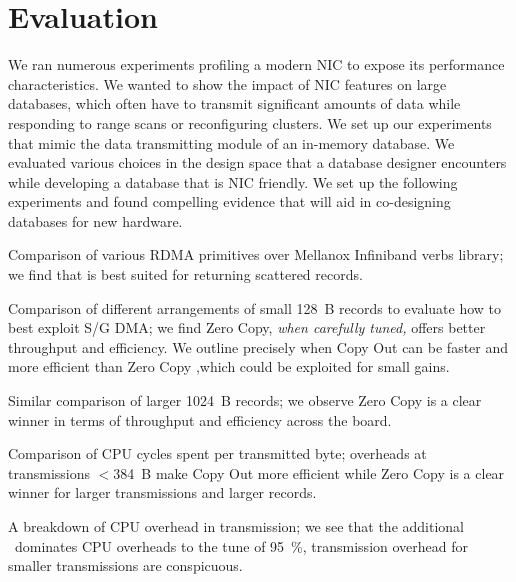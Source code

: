 \section{Evaluation}
We ran numerous experiments profiling a modern NIC to expose its performance characteristics. 
We wanted to show the impact of NIC features on large databases, which often have to 
transmit significant amounts of data while responding to range scans or reconfiguring clusters.
We set up our experiments that mimic the data transmitting module of an in-memory database. 
We evaluated various choices in the design space that a database designer encounters while developing 
a database that is NIC friendly. We set up the following experiments and found compelling 
evidence that will aid in co-designing databases for new hardware.
\begin{myitemize}
\item Comparison of various RDMA primitives over Mellanox Infiniband verbs library; we find that  is best suited for returning scattered records.
\item Comparison of different arrangements of small 128~B records to evaluate how to best exploit S/G DMA; we find Zero Copy, {\em when carefully tuned,} offers better throughput and efficiency. We outline precisely when Copy Out can be faster 
and more efficient than Zero Copy ,which could be exploited for small gains.
\item Similar comparison of larger 1024~B records; we observe Zero Copy is a clear winner in terms of throughput and efficiency across the board.
\item Comparison of CPU cycles spent per transmitted byte; overheads at transmissions $<$384~B make Copy Out more efficient while Zero Copy is a clear winner for larger transmissions and larger records.
\item A breakdown of CPU overhead in transmission; we see that the additional \memcpy ~dominates CPU overheads to the tune of 95~\%, transmission overhead for smaller transmissions are conspicuous.
\end{myitemize}



